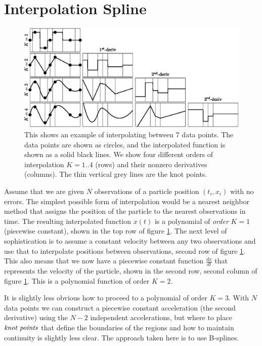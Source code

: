 \documentclass[10pt,journal]{IEEEtran}
\begin{document}
%
\section{Interpolation Spline}
\label{sec:interpolation}
%

\begin{figure}[h]
  \centerline{\includegraphics[width=39pc,angle=0]{figures/interpolation}}
  
  \caption{This shows an example of interpolating between 7 data points. The data points are shown as circles, and the interpolated function is shown as a solid black lines. We show four different orders of interpolation $K=1..4$ (rows) and their nonzero derivatives (columns). The thin vertical grey lines are the knot points.}
  \label{interpolation}
\end{figure}

Assume that we are given $N$ observations of a particle position $(t_i,x_i)$ with no errors. The simplest possible form of interpolation would be a nearest neighbor method that assigns the position of the particle to the nearest observations in time. The resulting interpolated function $x(t)$ is a polynomial of \emph{order} $K=1$ (piecewise constant), shown in the top row of figure \ref{interpolation}. The next level of sophistication is to assume a constant velocity between any two observations and use that to interpolate positions between observations, second row of figure \ref{interpolation}. This also means that we now have a piecewise constant function $\frac{dx}{dt}$ that represents the velocity of the particle, shown in the second row, second column of figure  \ref{interpolation}. This is a polynomial function of order $K=2$.

It is slightly less obvious how to proceed to a polynomial of order $K=3$. With $N$ data points we can construct a piecewise constant acceleration (the second derivative) using the $N-2$ independent accelerations, but where to place $\emph{knot points}$ that define the boundaries of the regions and how to maintain continuity is slightly less clear. The approach taken here is to use B-splines.
\end{document}
